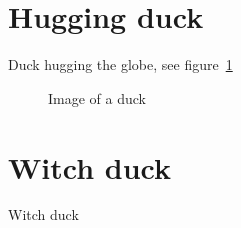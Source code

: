 \newpage


\section{Hugging duck}

Duck hugging the globe, see figure~\ref{fig:duck}

\begin{figure}
\caption{Image of a duck\label{fig:duck}}
\end{figure}


\section{Witch duck}

Witch duck

